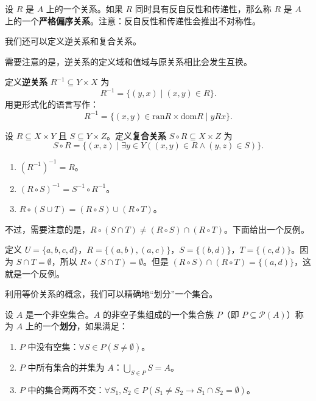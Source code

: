 \begin{definition}[严格偏序]
设 $R$ 是 $A$ 上的一个关系。如果 $R$ 同时具有反自反性和传递性，那么称 $R$ 是 $A$ 上的一个\textbf{严格偏序关系}。注意：反自反性和传递性会推出不对称性。
\end{definition}

我们还可以定义逆关系和复合关系。

需要注意的是，逆关系的定义域和值域与原关系相比会发生互换。

\begin{definition}[逆关系]
定义\textbf{逆关系} $R^{-1}\subseteq Y\times X$ 为
\[
R^{-1}=\{(y,x)\mid (x,y)\in R\}.
\]
用更形式化的语言写作：
\[
R^{-1}=\{(x,y)\in \text{ran}R\times \text{dom}R\mid yRx\}.
\]
\end{definition}

\begin{definition}[复合关系]
设 $R\subseteq X\times Y$ 且 $S\subseteq Y\times Z$。定义\textbf{复合关系} $S\circ R\subseteq X\times Z$ 为
\[
S\circ R=\{(x,z)\mid \exists y\in Y((x,y)\in R\wedge (y,z)\in S)\}.
\]
\end{definition}

\begin{theorem}
\begin{enumerate}
    \item $(R^{-1})^{-1}=R$。
    \item $(R\circ S)^{-1}=S^{-1}\circ R^{-1}$。
    \item $R\circ (S\cup T)=(R\circ S)\cup(R\circ T)$。
\end{enumerate}
\end{theorem}

不过，需要注意的是，$R\circ(S\cap T)\ne (R\circ S)\cap(R\circ T)$。下面给出一个反例。

定义 $U=\{a,b,c,d\}$，$R=\{(a,b),(a,c)\}$，$S=\{(b,d)\}$，$T=\{(c,d)\}$。因为 $S\cap T=\emptyset$，所以 $R\circ(S\cap T)=\emptyset$。但是 $(R\circ S)\cap(R\circ T)=\{(a,d)\}$，这就是一个反例。

利用等价关系的概念，我们可以精确地“划分”一个集合。

\begin{definition}[划分]
设 $A$ 是一个非空集合。$A$ 的非空子集组成的一个集合族 $P$（即 $P\subseteq\mathcal{P}(A)$）称为 $A$ 上的一个\textbf{划分}，如果满足：
\begin{enumerate}
    \item $P$ 中没有空集：$\forall S\in P(S\ne\emptyset)$。
    \item $P$ 中所有集合的并集为 $A$：$\bigcup_{S\in P}S=A$。
    \item $P$ 中的集合两两不交：$\forall S_1,S_2\in P(S_1\ne S_2\to S_1\cap S_2=\emptyset)$。
\end{enumerate}
\end{definition}

